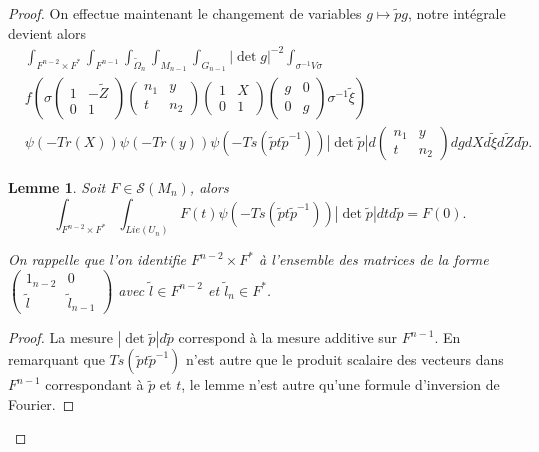\documentclass{amsart}
\newtheorem{lemme}{Lemme}[section]
\begin{document}
\begin{proof}
On effectue maintenant le changement de variables $g \mapsto \widetilde{p}g$, notre intégrale devient alors
\begin{equation}
\begin{split}
& \int_{F^{n-2} \times F^*} \int_{F^{n-1}} \int_{\widetilde{\Omega}_n} \int_{M_{n-1}} \int_{G_{n-1}}  |\det g|^{-2}\int_{\sigma^{-1}V\sigma} \\
& f\left(\sigma \begin{pmatrix}
1 & -\widetilde{Z} \\
0 & 1
\end{pmatrix}  \begin{pmatrix}
n_1 & y \\
t & n_2
\end{pmatrix} \begin{pmatrix}
1 & X \\
0 & 1
\end{pmatrix} \begin{pmatrix}
g & 0 \\
0 & g
\end{pmatrix} \sigma^{-1} \widetilde{\xi}\right) \\
& \psi(-Tr(X)) \psi(-Tr(y)) \psi(-Ts(\widetilde{p}t\widetilde{p}^{-1}))  |\det \widetilde{p}| d\begin{pmatrix}
n_1 & y \\
t & n_2
\end{pmatrix} dg dX d\widetilde{\xi} d\widetilde{Z} d\widetilde{p}.
\end{split}
\end{equation}

\begin{lemme}
Soit $F \in \mathcal{S}(M_n)$, alors
\begin{equation}
\int_{F^{n-2} \times F^*} \int_{Lie(U_n)} F(t) \psi(-Ts(\widetilde{p}t\widetilde{p}^{-1}))|\det \widetilde{p}| dt d\widetilde{p} = F(0).
\end{equation}

On rappelle que l'on identifie $F^{n-2} \times F^*$ à l'ensemble des matrices de la forme $\begin{pmatrix}
1_{n-2} & 0 \\
\widetilde{l} & \widetilde{l}_{n-1}
\end{pmatrix}$ avec $\widetilde{l} \in F^{n-2}$ et $\widetilde{l}_{n} \in F^*$. 
\end{lemme}

\begin{proof}
La mesure $|\det \widetilde{p}| d\widetilde{p}$ correspond à la mesure additive sur $F^{n-1}$. En remarquant que $Ts(\widetilde{p}t\widetilde{p}^{-1})$ n'est autre que le produit scalaire des vecteurs dans $F^{n-1}$ correspondant à $\widetilde{p}$ et $t$, le lemme n'est autre qu'une
formule d'inversion de Fourier.
\end{proof}


\end{proof}
\end{document}
